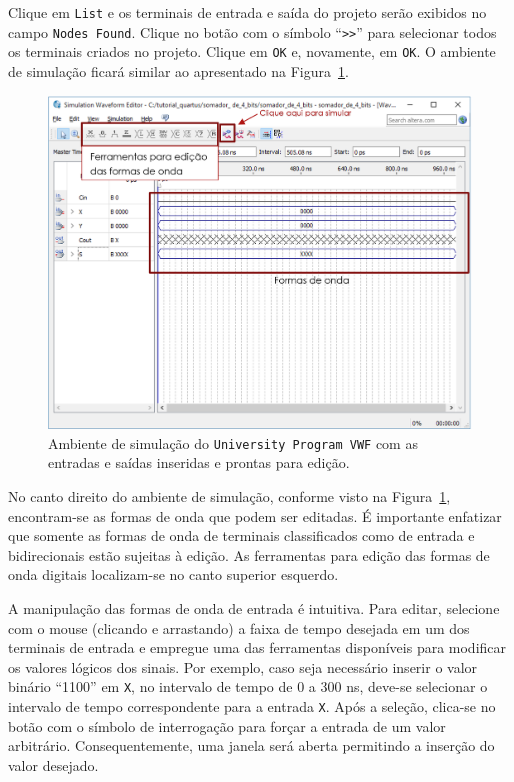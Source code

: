 \documentclass[12pt,a4paper]{article}
\begin{document}
Clique em \texttt{List} e os terminais de entrada e saída do projeto serão exibidos no campo \texttt{Nodes Found}. Clique no botão com o símbolo ``\texttt{>>}'' para selecionar todos os terminais criados no projeto. Clique em \texttt{OK} e, novamente, em \texttt{OK}. O ambiente de simulação ficará similar ao apresentado na Figura~\ref{fig:27}.

\begin{figure}[htbp!]
    \centering
    \includegraphics[width=\textwidth]{./figs/fig27.png}
    \caption{Ambiente de simulação do \texttt{University Program VWF} com as entradas e saídas inseridas e prontas para edição.}
    \label{fig:27}
\end{figure}

No canto direito do ambiente de simulação, conforme visto na Figura~\ref{fig:27}, encontram-se as formas de onda que podem ser editadas. É importante enfatizar que somente as formas de onda de terminais classificados como de entrada e bidirecionais estão sujeitas à edição. As ferramentas para edição das formas de onda digitais localizam-se no canto superior esquerdo. 

A manipulação das formas de onda de entrada é intuitiva. Para editar, selecione com o mouse (clicando e arrastando) a faixa de tempo desejada em um dos terminais de entrada e empregue uma das ferramentas disponíveis para modificar os valores lógicos dos sinais. Por exemplo, caso seja necessário inserir o valor binário ``1100'' em \texttt{X}, no intervalo de tempo de 0 a 300 ns, deve-se selecionar o intervalo de tempo correspondente para a entrada \texttt{X}. Após a seleção, clica-se no botão com o símbolo de interrogação para forçar a entrada de um valor arbitrário. Consequentemente, uma janela será aberta permitindo a inserção do valor desejado.
\end{document}
